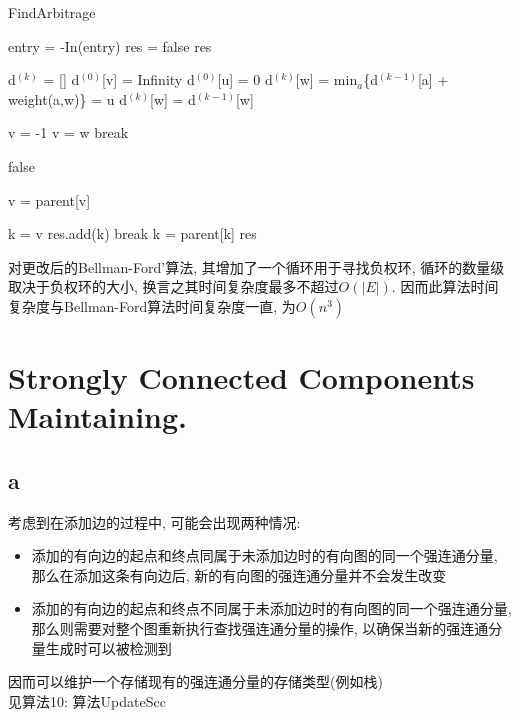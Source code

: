\documentclass{article}
\begin{document}
\begin{algorithm}
\caption{FindArbitrage}
\begin{algorithmic}[1]
\State entry = -In(entry)
\EndFor
\State res = 
\State \Return false
\EndIf
\State \Return res
\EndProcedure

\State d$^{(k)}$ = [] 
\EndFor
{}
\State d$^{(0)}$[v] = Infinity
\EndFor
\State d$^{(0)}$[u] = 0
\State d$^{(k)}$[w] = min$_a$\{d$^{(k-1)}$[a] + weight(a,w)\}
\State [parent[v] = u
\Else
\State d$^{(k)}$[w] = d$^{(k-1)}$[w]
\EndIf
\EndFor
\EndFor

\State v = -1
\State v = w
\State break
\EndIf
\EndFor

\State \Return false
\EndIf

\State v = parent[v]
\EndFor

\State k = v
\State res.add(k)
\State break
\EndIf
\State k = parent[k]
\EndWhile
\State \Return res
\EndProcedure
\end{algorithmic}
\end{algorithm}

对更改后的Bellman-Ford'算法, 其增加了一个循环用于寻找负权环, 循环的数量级取决于负权环的大小, 换言之其时间复杂度最多不超过$O(|E|)$. 因而此算法时间复杂度与Bellman-Ford算法时间复杂度一直, 为$O(n^3)$

\section{Strongly Connected Components Maintaining.}

\subsection{a}
考虑到在添加边的过程中, 可能会出现两种情况:
\begin{itemize}
\item 添加的有向边的起点和终点同属于未添加边时的有向图的同一个强连通分量, 那么在添加这条有向边后, 新的有向图的强连通分量并不会发生改变
\item 添加的有向边的起点和终点不同属于未添加边时的有向图的同一个强连通分量, 那么则需要对整个图重新执行查找强连通分量的操作, 以确保当新的强连通分量生成时可以被检测到
\end{itemize}
因而可以维护一个存储现有的强连通分量的存储类型(例如栈) \\
见算法10: 算法UpdateScc
\end{document}
